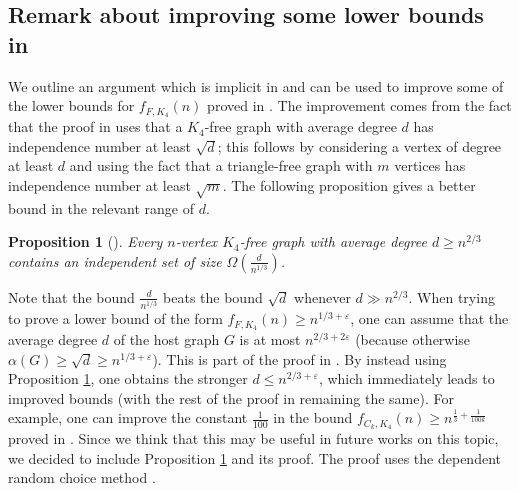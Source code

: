 \documentclass[11pt]{article}
\theoremstyle{plain}
\newtheorem{proposition}[theorem]{Proposition}
\theoremstyle{definition}
\begin{document}
\subsection{Remark about improving some lower bounds in \cite{MV_general_graphs}}
We outline an argument which is implicit in \cite{Sudakov_DRC} and can be used to improve some of the lower bounds for
$f_{F,K_4}(n)$ proved in \cite{MV_general_graphs}. 
The improvement comes from the fact that the proof in \cite{MV_general_graphs} uses that a $K_4$-free graph with average degree $d$ has independence number at least $\sqrt{d}$; this follows by considering a vertex of degree at least $d$ and using the fact that a triangle-free graph with $m$ vertices has independence number at least $\sqrt{m}$. The following proposition gives a better bound in the relevant range of $d$.
\begin{proposition}[\cite{Sudakov_DRC}]\label{prop:DRC}
    Every $n$-vertex $K_4$-free graph with average degree $d \geq n^{2/3}$ contains an independent set of size $\Omega( \frac{d}{n^{1/3}})$.
\end{proposition}
\noindent
Note that the bound $\frac{d}{n^{1/3}}$ beats the bound $\sqrt{d}$ whenever $d \gg n^{2/3}$. When trying to prove a lower bound of the form $f_{F,K_4}(n) \geq n^{1/3 + \varepsilon}$, one can assume that the average degree $d$ of the host graph $G$ is at most $n^{2/3+2\varepsilon}$ (because otherwise $\alpha(G) \geq \sqrt{d} \geq n^{1/3+\varepsilon}$). This is part of the proof in \cite{MV_general_graphs}. By instead using Proposition \ref{prop:DRC}, one obtains the stronger $d \leq n^{2/3 + \varepsilon}$, which immediately leads to improved bounds (with the rest of the proof in \cite{MV_general_graphs} remaining the same). For example, one can improve the constant $\frac{1}{100}$ in the bound $f_{C_k,K_4}(n) \geq n^{\frac{1}{3} + \frac{1}{100k}}$ proved in \cite{MV_general_graphs}. Since we think that this may be useful in future works on this topic, we decided to include Proposition \ref{prop:DRC} and its proof. The proof uses the dependent random choice method \cite{FoxSudakov}.
\end{document}
